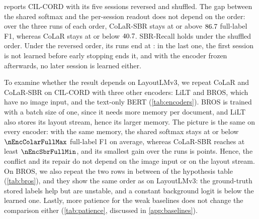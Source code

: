   reports CIL-CORD with its five sessions reversed and shuffled. The gap between the shared softmax and the per-session readout does not depend on the order: over the three runs of each order, CoLaR-SBR stays at or above $86.7$ full-label F1, whereas CoLaR stays at or below $40.7$. SBR-Recall holds under the shuffled order. Under the reversed order, its runs end at \nOrderRevRecallRuns: in the last one, the first session is not learned before early stopping ends it, and with the encoder frozen afterwards, no later session is learned either.

\begin{table}[t]
\centering\small
\setlength{\tabcolsep}{4pt}
\caption{\textbf{Four encoders} on CIL-CORD (full-label F1, mean $\pm$ s.d.\ of three runs). Smallest gain: CoLaR-SBR minus CoLaR in the least favourable run.}
\label{tab:encoders}
\resizebox{\linewidth}{!}{}
\end{table}

\begin{table}[t]
\centering\small
\setlength{\tabcolsep}{5pt}
\caption{\textbf{BROS} on CIL-CORD: the rows of the hypothesis table (mean $\pm$ s.d.\ of three runs). $^{r}$Uses the ground-truth labels.}
\label{tab:bros}
\resizebox{\linewidth}{!}{}
\end{table}

 To examine whether the result depends on LayoutLMv3, we repeat CoLaR and CoLaR-SBR on CIL-CORD with three other encoders: LiLT and BROS, which have no image input, and the text-only BERT (\cref{tab:encoders}). BROS is trained with a batch size of one, since it needs more memory per document, and LiLT also stores its layout stream, hence its larger memory. The picture is the same on every encoder: with the same memory, the shared softmax stays at or below $\nEncColarFullMax$ full-label F1 on average, whereas CoLaR-SBR reaches at least $\nEncSbrFullMin$, and its smallest gain over the runs is \nEncGainFullMin{} points. Hence, the conflict and its repair do not depend on the image input or on the layout stream. On BROS, we also repeat the two rows in between of the hypothesis table (\cref{tab:bros}), and they show the same order as on LayoutLMv3: the ground-truth stored labels help but are unstable, and a constant background logit is below the learned one. Lastly, more patience for the weak baselines does not change the comparison either (\cref{tab:patience}, discussed in \cref{app:baselines}).

